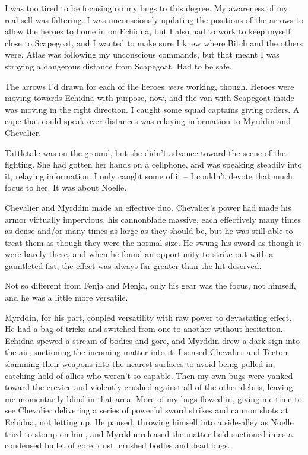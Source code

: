 I was too tired to be focusing on my bugs to this degree.  My awareness of my real self was faltering.  I was unconsciously updating the positions of the arrows to allow the heroes to home in on Echidna, but I also had to work to keep myself close to Scapegoat, and I wanted to make sure I knew where Bitch and the others were.  Atlas was following my unconscious commands, but that meant I was straying a dangerous distance from Scapegoat.  Had to be safe.



The arrows I'd drawn for each of the heroes \emph{were} working, though.  Heroes were moving towards Echidna with purpose, now, and the van with Scapegoat inside was moving in the right direction.  I caught some squad captains giving orders.  A cape that could speak over distances was relaying information to Myrddin and Chevalier.



Tattletale was on the ground, but she didn't advance toward the scene of the fighting.  She had gotten her hands on a cellphone, and was speaking steadily into it, relaying information. I only caught some of it – I couldn't devote that much focus to her.  It was about Noelle.



Chevalier and Myrddin made an effective duo.  Chevalier's power had made his armor virtually impervious, his cannonblade massive, each effectively many times as dense and/or many times as large as they should be, but he was still able to treat them as though they were the normal size.  He swung his sword as though it were barely there, and when he found an opportunity to strike out with a gauntleted fist, the effect was always far greater than the hit deserved.



Not so different from Fenja and Menja, only his gear was the focus, not himself, and he was a little more versatile.



Myrddin, for his part, coupled versatility with raw power to devastating effect.  He had a bag of tricks and switched from one to another without hesitation.  Echidna spewed a stream of bodies and gore, and Myrddin drew a dark sign into the air, suctioning the incoming matter into it.  I sensed Chevalier and Tecton slamming their weapons into the nearest surfaces to avoid being pulled in, catching hold of allies who weren't so capable.  Then my own bugs were yanked toward the crevice and violently crushed against all of the other debris, leaving me momentarily blind in that area.  More of my bugs flowed in, giving me time to see Chevalier delivering a series of powerful sword strikes and cannon shots at Echidna, not letting up.  He paused, throwing himself into a side-alley as Noelle tried to stomp on him, and Myrddin released the matter he'd suctioned in as a condensed bullet of gore, dust, crushed bodies and dead bugs.



